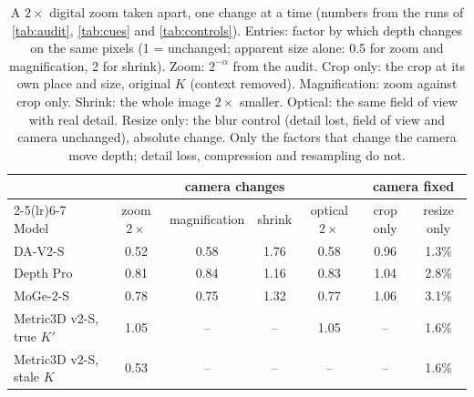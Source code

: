 \begin{table}[t]\centering\small
\caption{A $2\times$ digital zoom taken apart, one change at a time (numbers from the runs of \cref{tab:audit}, \cref{tab:cues} and \cref{tab:controls}). Entries: factor by which depth changes on the same pixels (1 = unchanged; apparent size alone: 0.5 for zoom and magnification, 2 for shrink). Zoom: $2^{-\alpha}$ from the audit. Crop only: the crop at its own place and size, original $K$ (context removed). Magnification: zoom against crop only. Shrink: the whole image $2\times$ smaller. Optical: the same field of view with real detail. Resize only: the blur control (detail lost, field of view and camera unchanged), absolute change. Only the factors that change the camera move depth; detail loss, compression and resampling do not.}\label{tab:factorial}
\setlength{\tabcolsep}{5pt}
\begin{tabular}{lcccccc}\toprule
& \multicolumn{4}{c}{camera changes} & \multicolumn{2}{c}{camera fixed} \\ \cmidrule(lr){2-5}\cmidrule(lr){6-7}
Model & zoom $2\times$ & magnification & shrink & optical $2\times$ & crop only & resize only \\ \midrule
DA-V2-S & 0.52 & 0.58 & 1.76 & 0.58 & 0.96 & 1.3\% \\
Depth Pro & 0.81 & 0.84 & 1.16 & 0.83 & 1.04 & 2.8\% \\
MoGe-2-S & 0.78 & 0.75 & 1.32 & 0.77 & 1.06 & 3.1\% \\
Metric3D v2-S, true $K'$ & 1.05 & -- & -- & 1.05 & -- & 1.6\% \\
Metric3D v2-S, stale $K$ & 0.53 & -- & -- & -- & -- & 1.6\% \\
\bottomrule\end{tabular}\end{table}
